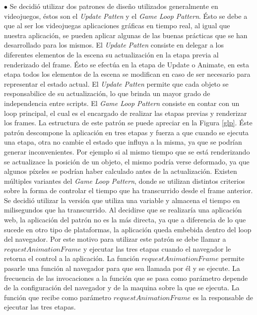 \documentclass[12pt]{article}
\begin{document}
$\bullet$ Se decidió utilizar dos patrones de diseño utilizados generalmente en videojuegos, éstos son el \textit{Update Patten} y el \textit{Game Loop Pattern}\cite{patterns}\cite{engine}. Ésto se debe a que al ser los videojuegas aplicaciones gráficas en tiempo real, al igual que nuestra aplicación, se pueden aplicar algunas de las buenas prácticas que se han desarrollado para los mismos. El \textit{Update Patten} consiste en delegar a los diferentes elementos de la escena su actualización en la etapa previa al renderizado del frame. Ésto se efectúa en la etapa de Update o Animate, en esta etapa todos los elementos de la escena se modifican en caso de ser necesario para representar el estado actual. El \textit{Update Patten} permite que cada objeto se responsabilice de su actualización, lo que brinda un mayor grado de independencia entre scripts. El \textit{Game Loop Pattern} consiste en contar con un loop principal, el cual es el encargado de realizar las etapas previas y renderizar los frames.  La estructura de este patrón se puede apreciar en la Figura \ref{glp}. Éste patrón descompone la aplicación en tres etapas y fuerza a que cuando se ejecuta una etapa, otra no cambie el estado que influya a la misma, ya que se podrían generar inconvenientes. Por ejemplo si al mismo tiempo que se está renderizando se actualizace la posición de un objeto, el mismo podría verse deformado, ya que algunos píxeles se podrían haber calculado antes de la actualización. Existen múltiples variantes del \textit{Game Loop Pattern}\cite{patterns}, donde se utilizan distintos criterios sobre la forma de controlar el tiempo que ha transcurrido desde el frame anterior. Se decidió utilizar la versión que utiliza una variable y almacena el tiempo en milisegundos que ha transcurrido. Al decidirse que se realizaría una aplicación web, la aplicación del patrón no es la más directa, ya que a diferencia de lo que sucede en otro tipo de plataformas, la aplicación queda embebida dentro del loop del navegador. Por este motivo para utilizar este patrón se debe llamar a $requestAnimationFrame$\cite{patterns} y ejecutar las tres etapas cuando el navegador le retorna el control a la aplicación. La función $requestAnimationFrame$ permite pasarle una función al navegador para que sea llamada por él  y se ejecute. La frecuencia de las invocaciones a la función que se pasa como parámetro depende de la configuración del navegador y de la maquina sobre la que se ejecuta. La función que recibe como parámetro $requestAnimationFrame$ es la responsable de ejecutar las tres etapas. 
\end{document}
